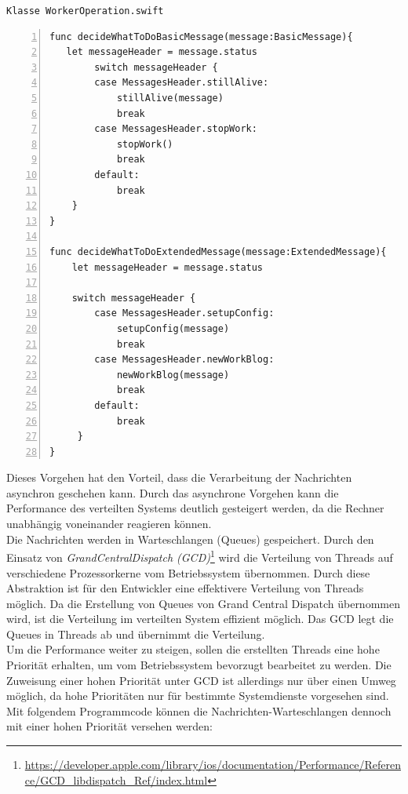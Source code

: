 \texttt{Klasse WorkerOperation.swift}
\begin{lstlisting}[basicstyle=\ttfamily,numbers=left,numberstyle=\footnotesize\ttfamily,backgroundcolor=\color{sourcegray}]
func decideWhatToDoBasicMessage(message:BasicMessage){
   let messageHeader = message.status
        switch messageHeader {
        case MessagesHeader.stillAlive:
            stillAlive(message)
            break
        case MessagesHeader.stopWork:
            stopWork()
            break
        default:
            break
    }
}

func decideWhatToDoExtendedMessage(message:ExtendedMessage){
    let messageHeader = message.status
    
    switch messageHeader {
        case MessagesHeader.setupConfig:
            setupConfig(message)
            break
        case MessagesHeader.newWorkBlog:
            newWorkBlog(message)
            break
        default:
            break
     }
}
\end{lstlisting}

Dieses Vorgehen hat den Vorteil, dass die Verarbeitung der Nachrichten asynchron geschehen kann. Durch das asynchrone Vorgehen kann die Performance des verteilten Systems deutlich gesteigert werden, da die Rechner unabhängig voneinander reagieren können. \\
Die Nachrichten werden in Warteschlangen (Queues) gespeichert. Durch den Einsatz von \emph{GrandCentralDispatch (GCD)}\footnote{\url{https://developer.apple.com/library/ios/documentation/Performance/Reference/GCD_libdispatch_Ref/index.html}} wird die Verteilung von Threads auf verschiedene Prozessorkerne vom Betriebssystem übernommen. Durch diese Abstraktion ist für den Entwickler eine effektivere Verteilung von Threads möglich. Da die Erstellung von Queues von Grand Central Dispatch übernommen wird, ist die Verteilung im verteilten System effizient möglich. Das GCD legt die Queues in Threads ab und übernimmt die Verteilung. \\
Um die Performance weiter zu steigen, sollen die erstellten Threads eine hohe Priorität erhalten, um vom Betriebssystem bevorzugt bearbeitet zu werden. Die Zuweisung einer hohen Priorität unter GCD ist allerdings nur über einen Umweg möglich, da hohe Prioritäten nur für bestimmte Systemdienste vorgesehen sind. Mit folgendem Programmcode können die Nachrichten-Warteschlangen dennoch mit einer hohen Priorität versehen werden:


